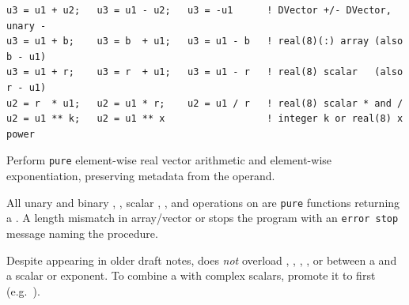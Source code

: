 

\lstset{language=[95]Fortran}
\begin{lstlisting}
u3 = u1 + u2;   u3 = u1 - u2;   u3 = -u1      ! DVector +/- DVector, unary -
u3 = u1 + b;    u3 = b  + u1;   u3 = u1 - b   ! real(8)(:) array (also b - u1)
u3 = u1 + r;    u3 = r  + u1;   u3 = u1 - r   ! real(8) scalar   (also r - u1)
u2 = r  * u1;   u2 = u1 * r;    u2 = u1 / r   ! real(8) scalar * and /
u2 = u1 ** k;   u2 = u1 ** x                  ! integer k or real(8) x power
\end{lstlisting}

Perform \texttt{pure} element-wise real vector arithmetic and element-wise exponentiation, preserving metadata from the  operand.

All unary and binary \procname{+}, \procname{-}, scalar \procname{*}, \procname{/}, and \procname{**} operations on  are \texttt{pure} functions returning a . A length mismatch in array/vector \procname{+} or \procname{-} stops the program with an \texttt{error stop} message naming the procedure.

\begin{notebox}
Despite appearing in older draft notes,  does \emph{not} overload \procname{+}, \procname{-}, \procname{*}, \procname{/}, or \procname{**} between a  and a  scalar or exponent. To combine a  with complex scalars, promote it to  first (e.g.\ ).
\end{notebox}

